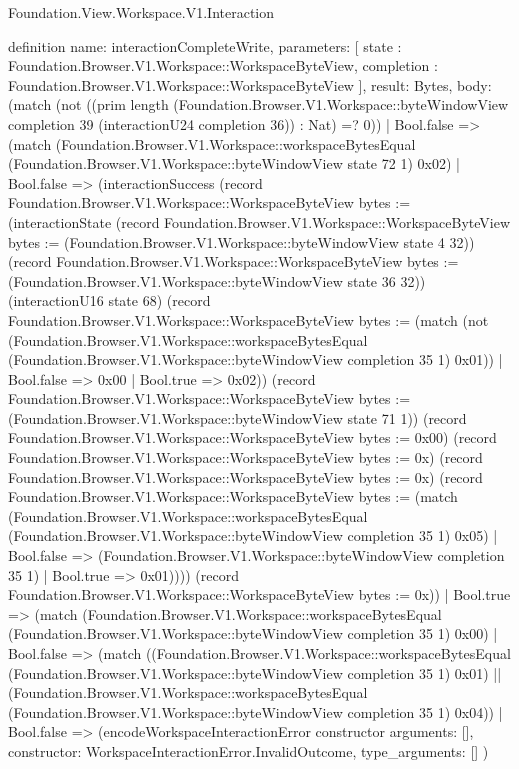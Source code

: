 \begin{lexlean}{Foundation.View.Workspace.V1.Interaction}
\begin{semanticmodule}
definition{
  name: interactionCompleteWrite,
  parameters: [
    state : Foundation.Browser.V1.Workspace::WorkspaceByteView,
    completion : Foundation.Browser.V1.Workspace::WorkspaceByteView
  ],
  result: Bytes,
  body: (match (not ((prim length (Foundation.Browser.V1.Workspace::byteWindowView completion 39 (interactionU24 completion 36)) : Nat) =? 0))
    | Bool.false => (match (Foundation.Browser.V1.Workspace::workspaceBytesEqual (Foundation.Browser.V1.Workspace::byteWindowView state 72 1) 0x02)
      | Bool.false => (interactionSuccess (record Foundation.Browser.V1.Workspace::WorkspaceByteView {bytes := (interactionState (record Foundation.Browser.V1.Workspace::WorkspaceByteView {bytes := (Foundation.Browser.V1.Workspace::byteWindowView state 4 32)}) (record Foundation.Browser.V1.Workspace::WorkspaceByteView {bytes := (Foundation.Browser.V1.Workspace::byteWindowView state 36 32)}) (interactionU16 state 68) (record Foundation.Browser.V1.Workspace::WorkspaceByteView {bytes := (match (not (Foundation.Browser.V1.Workspace::workspaceBytesEqual (Foundation.Browser.V1.Workspace::byteWindowView completion 35 1) 0x01))
        | Bool.false => 0x00
        | Bool.true => 0x02)}) (record Foundation.Browser.V1.Workspace::WorkspaceByteView {bytes := (Foundation.Browser.V1.Workspace::byteWindowView state 71 1)}) (record Foundation.Browser.V1.Workspace::WorkspaceByteView {bytes := 0x00}) (record Foundation.Browser.V1.Workspace::WorkspaceByteView {bytes := 0x}) (record Foundation.Browser.V1.Workspace::WorkspaceByteView {bytes := 0x}) (record Foundation.Browser.V1.Workspace::WorkspaceByteView {bytes := (match (Foundation.Browser.V1.Workspace::workspaceBytesEqual (Foundation.Browser.V1.Workspace::byteWindowView completion 35 1) 0x05)
        | Bool.false => (Foundation.Browser.V1.Workspace::byteWindowView completion 35 1)
        | Bool.true => 0x01)}))}) (record Foundation.Browser.V1.Workspace::WorkspaceByteView {bytes := 0x}))
      | Bool.true => (match (Foundation.Browser.V1.Workspace::workspaceBytesEqual (Foundation.Browser.V1.Workspace::byteWindowView completion 35 1) 0x00)
        | Bool.false => (match ((Foundation.Browser.V1.Workspace::workspaceBytesEqual (Foundation.Browser.V1.Workspace::byteWindowView completion 35 1) 0x01) || (Foundation.Browser.V1.Workspace::workspaceBytesEqual (Foundation.Browser.V1.Workspace::byteWindowView completion 35 1) 0x04))
          | Bool.false => (encodeWorkspaceInteractionError constructor{
            arguments: [],
            constructor: WorkspaceInteractionError.InvalidOutcome,
            type_arguments: []
          })
}
\end{semanticmodule}
\end{lexlean}
